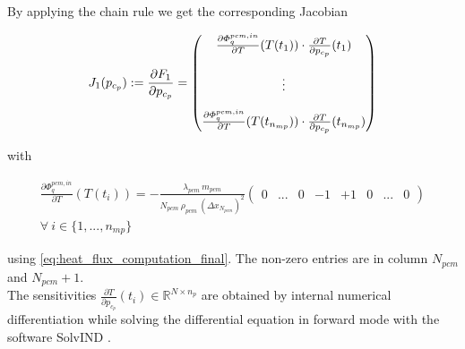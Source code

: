 \documentclass{scrartcl}[12pt, halfparskip]
\numberwithin{equation}{section}
\numberwithin{figure}{section}
\numberwithin{table}{section}
\begin{document}
By applying the chain rule we get the corresponding Jacobian

\begin{equation}
	J_1(p_{c_p}) := \frac{\partial F_1}{\partial p_{c_p}} =
	\begin{pmatrix}
		\frac{\partial \varPhi_{q}^{pcm,in}}{\partial T}(T(t_1)) \cdot \frac{\partial T}{\partial p_{c_p}}(t_1) \\
		\textcolor{white}{} \\
		\vdots \\
		\textcolor{white}{} \\
		\frac{\partial \varPhi_{q}^{pcm,in}}{\partial T}(T(t_{n_{mp}})) \cdot \frac{\partial T}{\partial p_{c_p}}(t_{n_{mp}}) \\
	\end{pmatrix}
	\label{eq:optimization_jacobian}
\end{equation}

with

\begin{align}
	\frac{\partial \varPhi_{q}^{pcm,in}}{\partial T}(T(t_i)) = - \frac{\lambda_{pcm} \ m_{pcm}}{N_{pcm} \ \rho_{pcm} \ (\Delta x_{N_{pcm}})^2}
	\begin{pmatrix}
	0 & ... & 0 & -1 & +1 & 0 & ... & 0
	\end{pmatrix}\\
	\forall \ i \in \{1,...,n_{mp} \} \nonumber
\end{align}

using \eqref{eq:heat_flux_computation_final}. The non-zero entries are in column $N_{pcm}$ and $N_{pcm}+1$. \\
The sensitivities $\frac{\partial T}{\partial p_{c_p}}(t_i) \in \mathbb{R}^{N \times n_p}$ are obtained by internal numerical differentiation while solving the differential equation in forward mode with the software SolvIND \cite{diss_jan}. \\
\end{document}
